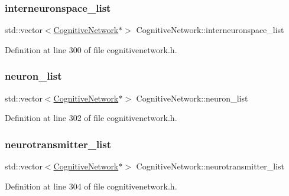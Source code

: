 \subsubsection{\texorpdfstring{interneuronspace\+\_\+list}{interneuronspace\_list}}
{\footnotesize\ttfamily std\+::vector$<$\hyperlink{class_cognitive_network}{Cognitive\+Network}$\ast$$>$ Cognitive\+Network\+::interneuronspace\+\_\+list\hspace{0.3cm}{\ttfamily [protected]}}



Definition at line 300 of file cognitivenetwork.\+h.

\mbox{\label{class_cognitive_network_abbb9ff97e1b9cd61602d95f44c30132e}} 
\subsubsection{\texorpdfstring{neuron\+\_\+list}{neuron\_list}}
{\footnotesize\ttfamily std\+::vector$<$\hyperlink{class_cognitive_network}{Cognitive\+Network}$\ast$$>$ Cognitive\+Network\+::neuron\+\_\+list\hspace{0.3cm}{\ttfamily [protected]}}



Definition at line 302 of file cognitivenetwork.\+h.

\mbox{\label{class_cognitive_network_a7018bee3dbf538c3d0c81a64aa002ab8}} 
\subsubsection{\texorpdfstring{neurotransmitter\+\_\+list}{neurotransmitter\_list}}
{\footnotesize\ttfamily std\+::vector$<$\hyperlink{class_cognitive_network}{Cognitive\+Network}$\ast$$>$ Cognitive\+Network\+::neurotransmitter\+\_\+list\hspace{0.3cm}{\ttfamily [protected]}}



Definition at line 304 of file cognitivenetwork.\+h.

\mbox{\label{class_cognitive_network_a263efd10857d5507c0e889e48f7329fe}} 
